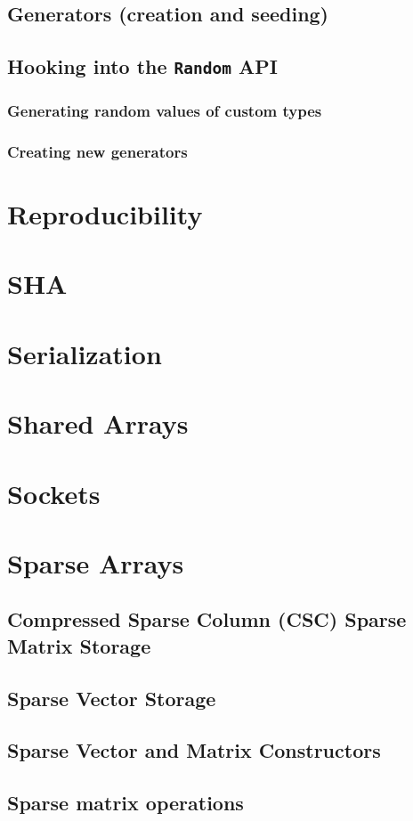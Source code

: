     \section{Generators (creation and seeding)}
    \section{Hooking into the \texttt{Random} API}
    \subsection{Generating random values of custom types}
    \subsection{Creating new generators}
  \chapter{Reproducibility}
  \chapter{SHA}
  \chapter{Serialization}
  \chapter{Shared Arrays}
  \chapter{Sockets}
  \chapter{Sparse Arrays}
    \section{Compressed Sparse Column (CSC) Sparse Matrix Storage}
    \section{Sparse Vector Storage}
    \section{Sparse Vector and Matrix Constructors}
    \section{Sparse matrix operations}
